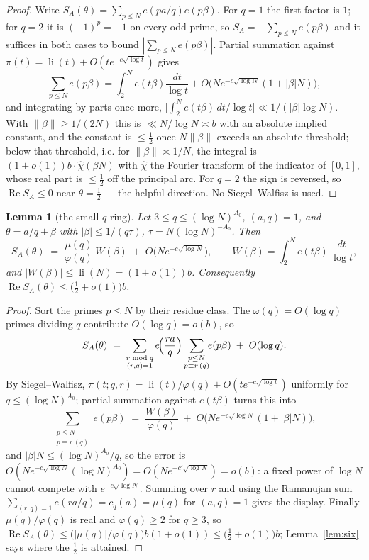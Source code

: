 \documentclass[11pt,a4paper]{article}
\theoremstyle{plain}
\newtheorem{lemma}[theorem]{Lemma}
\theoremstyle{definition}
\theoremstyle{remark}
\begin{document}
\begin{proof}
Write $S_A(\theta)=\sum_{p\le N}e(pa/q)e(p\beta)$. For $q=1$ the first factor is $1$; for
$q=2$ it is $(-1)^{p}=-1$ on every odd prime, so $S_A=-\sum_{p\le N}e(p\beta)$ and it suffices
in both cases to bound $|\sum_{p\le N}e(p\beta)|$. Partial summation against
$\pi(t)=\operatorname{li}(t)+O(te^{-c\sqrt{\log t}})$ gives
\[
  \sum_{p\le N}e(p\beta)=\int_2^{N}e(t\beta)\frac{dt}{\log t}
    +O\bigl(Ne^{-c\sqrt{\log N}}(1+|\beta|N)\bigr),
\]
and integrating by parts once more, $\bigl|\int_2^{N}e(t\beta)\,dt/\log t\bigr|
\ll1/(|\beta|\log N)$. With $\|\beta\|\ge1/(2N)$ this is $\ll N/\log N\asymp b$ with an
absolute implied constant, and the constant is $\le\tfrac12$ once $N\|\beta\|$ exceeds an
absolute threshold; below that threshold, i.e. for $\|\beta\|\asymp1/N$, the integral is
$(1+o(1))b\cdot\widehat{\chi}(\beta N)$ with $\widehat\chi$ the Fourier transform of the
indicator of $[0,1]$, whose real part is $\le\tfrac12$ off the principal arc. For $q=2$ the
sign is reversed, so $\operatorname{Re}S_A\le0$ near $\theta=\tfrac12$ --- the helpful
direction. No Siegel--Walfisz is used.
\end{proof}

\begin{lemma}[the small-$q$ ring]\label{lem:etab}
Let $3\le q\le(\log N)^{A_0}$, $(a,q)=1$, and $\theta=a/q+\beta$ with
$|\beta|\le1/(q\tau)$, $\tau=N(\log N)^{-A_0}$. Then
\[
  S_A(\theta)\;=\;\frac{\mu(q)}{\varphi(q)}\,W(\beta)\;+\;O\!\bigl(N e^{-c\sqrt{\log N}}\bigr),
  \qquad W(\beta)=\int_2^{N}e(t\beta)\,\frac{dt}{\log t},
\]
and $|W(\beta)|\le\operatorname{li}(N)=(1+o(1))b$. Consequently
$\operatorname{Re}S_A(\theta)\le\bigl(\tfrac12+o(1)\bigr)b$.
\end{lemma}

\begin{proof}
Sort the primes $p\le N$ by their residue class. The $\omega(q)=O(\log q)$ primes dividing $q$
contribute $O(\log q)=o(b)$, so
\[
  S_A(\theta)\;=\;\sum_{\substack{r\bmod q\\(r,q)=1}}e\!\Bigl(\frac{ra}{q}\Bigr)
    \sum_{\substack{p\le N\\p\equiv r\,(q)}}\!\!e(p\beta)\;+\;O(\log q).
\]
By Siegel--Walfisz, $\pi(t;q,r)=\operatorname{li}(t)/\varphi(q)+O(te^{-c\sqrt{\log t}})$
uniformly for $q\le(\log N)^{A_0}$; partial summation against $e(t\beta)$ turns this into
\[
  \sum_{\substack{p\le N\\p\equiv r\,(q)}}\!\!e(p\beta)
  \;=\;\frac{W(\beta)}{\varphi(q)}
     \;+\;O\!\bigl(Ne^{-c\sqrt{\log N}}(1+|\beta|N)\bigr),
\]
and $|\beta|N\le(\log N)^{A_0}/q$, so the error is $O(Ne^{-c\sqrt{\log N}}(\log N)^{A_0})
=O(Ne^{-c'\sqrt{\log N}})=o(b)$: a fixed power of $\log N$ cannot compete with
$e^{-c\sqrt{\log N}}$. Summing over $r$ and using the Ramanujan sum
$\sum_{(r,q)=1}e(ra/q)=c_q(a)=\mu(q)$ for $(a,q)=1$ gives the display. Finally
$\mu(q)/\varphi(q)$ is real and $\varphi(q)\ge2$ for $q\ge3$, so
$\operatorname{Re}S_A(\theta)\le\bigl(|\mu(q)|/\varphi(q)\bigr)b(1+o(1))\le
\bigl(\tfrac12+o(1)\bigr)b$; Lemma~\ref{lem:six} says where the $\tfrac12$ is attained.
\end{proof}
\end{document}

